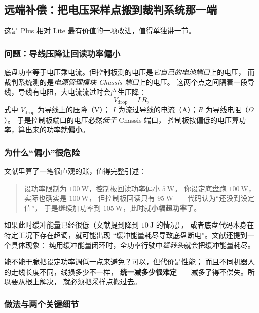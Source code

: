 \documentclass[cn,blue,11pt,device=normal]{elegantnote}
\begin{document}
\subsection{远端补偿：把电压采样点搬到裁判系统那一端}\label{sec:remotesense}

这是 Plus 相对 Lite 最有价值的一项改进，值得单独讲一节。

\subsubsection{问题：导线压降让回读功率偏小}

底盘功率等于电压乘电流。但控制板测的电压是\emph{它自己的电池端口}上的电压，
而裁判系统测的是\emph{电源管理模块 Chassis 端口}上的电压。
这两个点之间隔着一段导线，导线有电阻，大电流流过时会产生压降：
\begin{equation}\label{eq:vdrop}
  V_{\mathrm{drop}} = I\,R ,
\end{equation}
式中 $V_{\mathrm{drop}}$ 为导线上的压降（V）；
$I$ 为流过导线的电流（A）；$R$ 为导线电阻（$\Omega$）。
于是控制板端口的电压必然\emph{低于} Chassis 端口，
控制板按偏低的电压算功率，算出来的功率就\textbf{偏小}。

\subsubsection{为什么“偏小”很危险}

文献里算了一笔很直观的账，值得完整引述：

\begin{quote}
设功率限制为 $100\ \mathrm{W}$，控制板回读功率偏小 $5\ \mathrm{W}$。
你设定底盘跑 $100\ \mathrm{W}$，实际也确实是 $100\ \mathrm{W}$，
但控制板回读只有 $95\ \mathrm{W}$——代码认为“还没到设定值”，
于是继续加功率到 $105\ \mathrm{W}$，此时就\textbf{小幅超功率}了。
\end{quote}

如果此时缓冲能量已经很低（文献提到降到 $10\ \mathrm{J}$ 的情况），
或者底盘代码本身在特定工况下存在超调，就可能出现
“缓冲能量耗尽导致底盘断电”。文献还提到一个具体现象：
纯用缓冲能量闭环时，全功率行驶中\emph{猛转头}就会把缓冲能量耗尽。

能不能干脆把设定功率调低一点来避免？可以，但代价是性能；
而且不同机器人的走线长度不同，线损多少不一样，
\textbf{统一减多少很难定}——减多了得不偿失。所以要从根上解决，
就必须把采样点搬过去。

\subsubsection{做法与两个关键细节}
\end{document}
